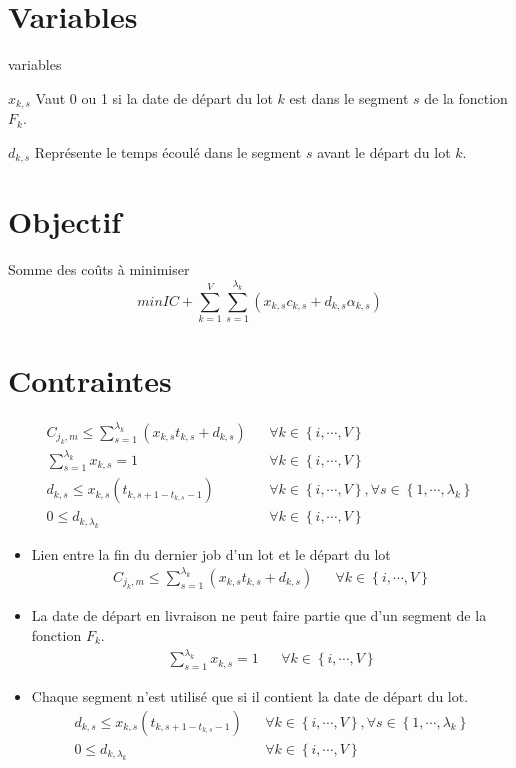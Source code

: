 \section{Variables}

\begin{labeling}{variables}
	\item [$x_{k, s}$]
	Vaut 0 ou 1 si la date de départ du lot $k$ est dans le segment $s$ de la fonction $F_k$.
	\item [$d_{k, s}$]
	Représente le temps écoulé dans le segment $s$ avant le départ du lot $k$.
\end{labeling}


\section{Objectif}
Somme des coûts à minimiser
$$min IC + \sum_{k=1}^{V} \sum_{s=1}^{\lambda_k} \left(x_{k, s} c_{k, s}+ d_{k,s} \alpha_{k, s} \right)$$


\section{Contraintes}

\begin{align}
    C_{j_k, m} \leq \sum_{s=1}^{\lambda_k} \left( x_{k,s} t_{k, s} + d_{k, s} \right) && \forall k \in \left\{i, \cdots, V \right\}\\
    \sum_{s=1}^{\lambda_k} x_{k, s} = 1 && \forall k \in \left\{i, \cdots, V \right\} \\
    d_{k, s} \leq x_{k, s} \left( t_{k, s+1 - t_{k, s} -1} \right) && \forall k \in \left\{i, \cdots, V \right\}, \forall s \in \left\{1, \cdots, \lambda_k\right\} \\
    0 \leq d_{k, \lambda_k} && \forall k \in \left\{i, \cdots, V \right\}
\end{align}
\begin{itemize}
	\item 
		Lien entre la fin du dernier job d'un lot et le départ du lot
		\begin{align}
			C_{j_k, m} \leq \sum_{s=1}^{\lambda_k} \left( x_{k,s} t_{k, s} + d_{k, s} \right) && \forall k \in \left\{i, \cdots, V \right\}		
		\end{align}
	\item 
		La date de départ en livraison ne peut faire partie que d'un segment de la fonction $F_k$.
		\begin{align}
			\sum_{s=1}^{\lambda_k} x_{k, s} = 1 && \forall k \in \left\{i, \cdots, V \right\}			
		\end{align}
	\item 
		Chaque segment n'est utilisé que si il contient la date de départ du lot.
		\begin{align}
			d_{k, s} \leq x_{k, s} \left( t_{k, s+1 - t_{k, s} -1} \right) && \forall k \in \left\{i, \cdots, V \right\}, \forall s \in \left\{1, \cdots, \lambda_k\right\} \\
			0 \leq d_{k, \lambda_k} && \forall k \in \left\{i, \cdots, V \right\}
		\end{align}
\end{itemize}

